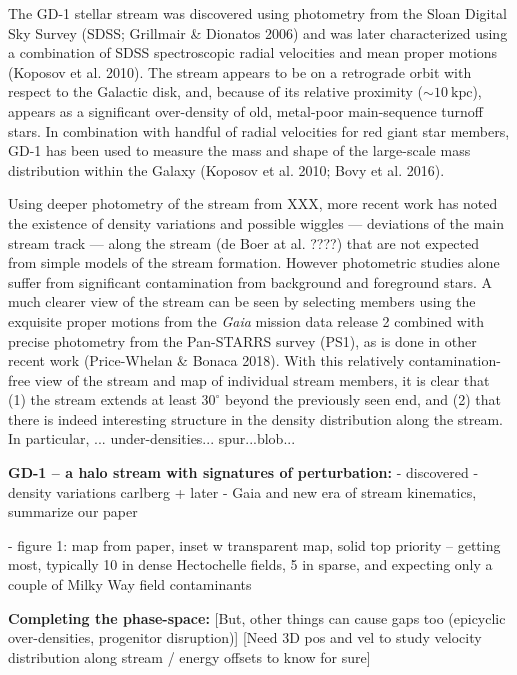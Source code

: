 \documentclass[12pt]{article}
\begin{document}
The GD-1 stellar stream was discovered using photometry from the Sloan Digital Sky Survey (SDSS; Grillmair \& Dionatos 2006) and was later characterized using a combination of SDSS spectroscopic radial velocities and mean proper motions (Koposov et al. 2010).
The stream appears to be on a retrograde orbit with respect to the Galactic disk, and, because of its relative proximity ($\sim 10~\textrm{kpc}$), appears as a significant over-density of old, metal-poor main-sequence turnoff stars.
In combination with handful of radial velocities for red giant star members, GD-1 has been used to measure the mass and shape of the large-scale mass distribution within the Galaxy (Koposov et al. 2010; Bovy et al. 2016).

Using deeper photometry of the stream from XXX, more recent work has noted the existence of density variations and possible wiggles --- deviations of the main stream track --- along the stream (de Boer at al. ????) that are not expected from simple models of the stream formation.
However photometric studies alone suffer from significant contamination from background and foreground stars.
A much clearer view of the stream can be seen by selecting members using the exquisite proper motions from the \textit{Gaia} mission data release 2 combined with precise photometry from the Pan-STARRS survey (PS1), as is done in other recent work (Price-Whelan \& Bonaca 2018).
With this relatively contamination-free view of the stream and map of individual stream members, it is clear that (1) the stream extends at least $30^\circ$ beyond the previously seen end, and (2) that there is indeed interesting structure in the density distribution along the stream.
In particular, ... under-densities... spur...blob...


{\bf GD-1 -- a halo stream with signatures of perturbation:}
- discovered
- density variations carlberg + later
- Gaia and new era of stream kinematics, summarize our paper

- figure 1: map from paper, inset w transparent map, solid top priority -- getting most, typically 10 in dense Hectochelle fields, 5 in sparse, and expecting only a couple of Milky Way field contaminants

{\bf Completing the phase-space:}
[But, other things can cause gaps too (epicyclic over-densities, progenitor disruption)]
[Need 3D pos and vel to study velocity distribution along stream / energy offsets to know for sure]
\end{document}
